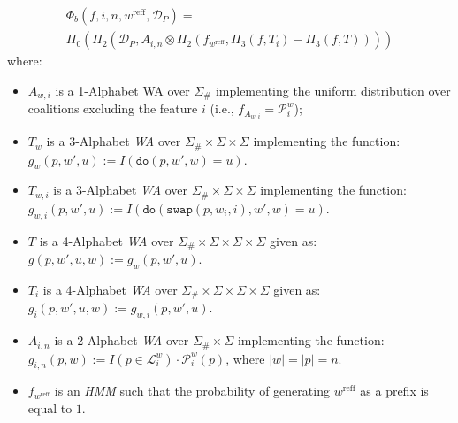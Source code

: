\begin{unumberedlemma}
{\begin{align*}
            \Phi_b(f,i,n,w^{\text{reff}},\mathcal{D}_P) = \quad\quad\quad\quad\quad\quad\quad\quad\quad\quad\quad\quad\quad\quad \\ \Pi_{0} ( \Pi_{2}(\mathcal{D}_P, A_{i,n} \otimes \Pi_{2}(f_{w^{\text{reff}}} ,
            \Pi_{3}(f,T_{i}) - \Pi_{3}(f,T)) ))
               \end{align*}
             } where:
    \begin{itemize}
        \item $A_{w,i}$ is a 1-Alphabet WA over $\Sigma_{\#}$ implementing the uniform distribution over coalitions excluding the feature $i$ (i.e., $f_{A_{w,i}} = \mathcal{P}_{i}^{w}$);
        \item $T_{w}$ is a 3-Alphabet \emph{WA} over $\Sigma_{\#} \times \Sigma \times \Sigma$ implementing the function: $ g_{w}(p,w',u) := I(\texttt{do}(p,w',w) = u)$.
        \item $T_{w,i}$ is a 3-Alphabet \emph{WA} over $\Sigma_{\#} \times \Sigma \times \Sigma$ implementing the function: $            g_{w,i}(p,w',u) := I(\texttt{do}(\texttt{swap}(p,w_{i},i),w',w) = u)$.
        \item $T$ is a 4-Alphabet \emph{WA} over $\Sigma_{\#} \times \Sigma \times \Sigma \times \Sigma$ given as: $g(p,w',u,w) := g_{w}(p,w',u)$.
        \item $T_{i}$ is a 4-Alphabet \emph{WA} over $\Sigma_{\#} \times \Sigma \times \Sigma \times \Sigma$ given as: $ g_{i}(p,w',u,w) := g_{w,i}(p,w',u)$.
        \item $A_{i,n}$ is a 2-Alphabet \emph{WA} over $\Sigma_{\#} \times \Sigma$ implementing the function:
         $g_{i,n}(p,w) := I(p \in \mathcal{L}_{i}^{w}) \cdot \mathcal{P}_{i}^{w}(p)$,
         where $|w| = |p| = n$.
       \item $f_{w^{\text{reff}}}$ is an \emph{HMM} such that the probability of generating $w^{\text{reff}}$ as a prefix is equal to $1$.
    \end{itemize}

\end{unumberedlemma}

